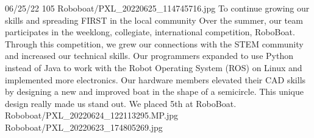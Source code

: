 {06/25/22}
{105}
{Roboboat/PXL_20220625_114745716.jpg}
{To continue growing our skills and spreading FIRST in the local community}
{Over the summer, our team participates in the weeklong, collegiate, international competition, RoboBoat. Through this competition, we grew our connections with the STEM community and increased our technical skills. Our programmers expanded to use Python instead of Java to work with the Robot Operating System (ROS) on Linux and implemented more electronics. Our hardware members elevated their CAD skills by designing a new and improved boat in the shape of a semicircle. This unique design really made us stand out. We placed 5th at RoboBoat. 
} 
{Roboboat/PXL_20220624_122113295.MP.jpg}
{Roboboat/PXL_20220623_174805269.jpg}
